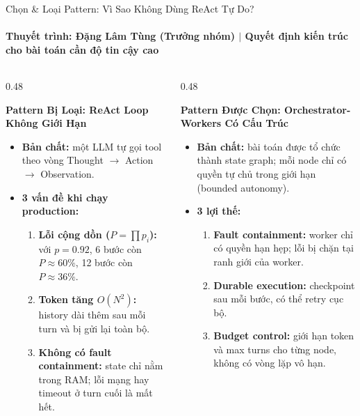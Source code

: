 \documentclass[aspectratio=1610,10pt,xcolor={table}]{beamer}
\begin{document}
\begin{frame}{Chọn \& Loại Pattern: Vì Sao Không Dùng ReAct Tự Do?}
  \framesubtitle{Thuyết trình: Đặng Lâm Tùng (Trưởng nhóm) $\vert$ Quyết định kiến trúc cho bài toán cần độ tin cậy cao}

  \begin{columns}[t]
    \begin{column}{0.48\textwidth}
      \begin{alertblock}{\textbf{Pattern Bị Loại: ReAct Loop Không Giới Hạn}}
        \scriptsize
        \begin{itemize}
          \item \textbf{Bản chất:} một LLM tự gọi tool theo vòng Thought $\to$ Action $\to$ Observation.
          \item \textbf{3 vấn đề khi chạy production:}
                \begin{enumerate}\scriptsize
                  \item \textbf{Lỗi cộng dồn ($P = \prod p_i$):} với $p = 0.92$, 6 bước còn $P \approx 60\%$, 12 bước còn $P \approx 36\%$.
                  \item \textbf{Token tăng $O(N^2)$:} history dài thêm sau mỗi turn và bị gửi lại toàn bộ.
                  \item \textbf{Không có fault containment:} state chỉ nằm trong RAM; lỗi mạng hay timeout ở turn cuối là mất hết.
                \end{enumerate}
        \end{itemize}
      \end{alertblock}
    \end{column}

    \begin{column}{0.48\textwidth}
      \begin{block}{\textbf{Pattern Được Chọn: Orchestrator-Workers Có Cấu Trúc}}
        \scriptsize
        \begin{itemize}
          \item \textbf{Bản chất:} bài toán được tổ chức thành state graph; mỗi node chỉ có quyền tự chủ trong giới hạn (bounded autonomy).
          \item \textbf{3 lợi thế:}
                \begin{enumerate}\scriptsize
                  \item \textbf{Fault containment:} worker chỉ có quyền hạn hẹp; lỗi bị chặn tại ranh giới của worker.
                  \item \textbf{Durable execution:} checkpoint sau mỗi bước, có thể retry cục bộ.
                  \item \textbf{Budget control:} giới hạn token và max turns cho từng node, không có vòng lặp vô hạn.
                \end{enumerate}
        \end{itemize}
      \end{block}
    \end{column}
  \end{columns}


\end{frame}
\end{document}
